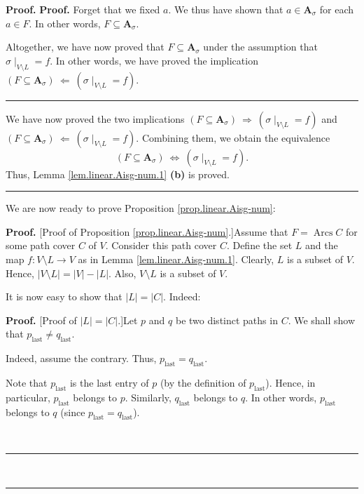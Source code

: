 \documentclass[numbers=enddot,12pt,final,onecolumn,notitlepage]{scrartcl}%
\numberwithin{exer}{section}
\theoremstyle{definition}
\newenvironment{proof}[1][Proof]{\noindent\textbf{#1.} }{\ \rule{0.5em}{0.5em}}
\newenvironment{verlong}{}{}
\begin{document}
\begin{verlong}
\begin{proof}
\begin{proof}
Forget that we fixed $a$. We thus have shown that $a\in\mathbf{A}_{\sigma}$
for each $a\in F$. In other words, $F\subseteq\mathbf{A}_{\sigma}$.

Altogether, we have now proved that $F\subseteq\mathbf{A}_{\sigma}$ under the
assumption that $\left.  \sigma\mid_{V\setminus L}\right.  =f$. In other
words, we have proved the implication $\left(  F\subseteq\mathbf{A}_{\sigma
}\right)  \ \Longleftarrow\ \left(  \left.  \sigma\mid_{V\setminus L}\right.
=f\right)  $.
\end{proof}

We have now proved the two implications $\left(  F\subseteq\mathbf{A}_{\sigma
}\right)  \ \Longrightarrow\ \left(  \left.  \sigma\mid_{V\setminus L}\right.
=f\right)  $ and $\left(  F\subseteq\mathbf{A}_{\sigma}\right)
\ \Longleftarrow\ \left(  \left.  \sigma\mid_{V\setminus L}\right.  =f\right)
$. Combining them, we obtain the equivalence
\[
\left(  F\subseteq\mathbf{A}_{\sigma}\right)  \ \Longleftrightarrow\ \left(
\left.  \sigma\mid_{V\setminus L}\right.  =f\right)  .
\]
Thus, Lemma \ref{lem.linear.Aisg-num.1} \textbf{(b)} is proved.
\end{proof}

We are now ready to prove Proposition \ref{prop.linear.Aisg-num}:

\begin{proof}
[Proof of Proposition \ref{prop.linear.Aisg-num}.]Assume that
$F=\operatorname*{Arcs}C$ for some path cover $C$ of $V$. Consider this path
cover $C$. Define the set $L$ and the map $f:V\setminus L\rightarrow V$ as in
Lemma \ref{lem.linear.Aisg-num.1}. Clearly, $L$ is a subset of $V$. Hence,
$\left\vert V\setminus L\right\vert =\left\vert V\right\vert -\left\vert
L\right\vert $. Also, $V\setminus L$ is a subset of $V$.

It is now easy to show that $\left\vert L\right\vert =\left\vert C\right\vert
$. Indeed:

\begin{proof}
[Proof of $\left\vert L\right\vert =\left\vert C\right\vert $.]Let $p$ and $q$
be two distinct paths in $C$. We shall show that $p_{\operatorname*{last}}\neq
q_{\operatorname*{last}}$.

Indeed, assume the contrary. Thus, $p_{\operatorname*{last}}%
=q_{\operatorname*{last}}$.

Note that $p_{\operatorname*{last}}$ is the last entry of $p$ (by the
definition of $p_{\operatorname*{last}}$). Hence, in particular,
$p_{\operatorname*{last}}$ belongs to $p$. Similarly, $q_{\operatorname*{last}%
}$ belongs to $q$. In other words, $p_{\operatorname*{last}}$ belongs to $q$
(since $p_{\operatorname*{last}}=q_{\operatorname*{last}}$).


\end{proof}
\end{proof}
\end{verlong}
\end{document}
